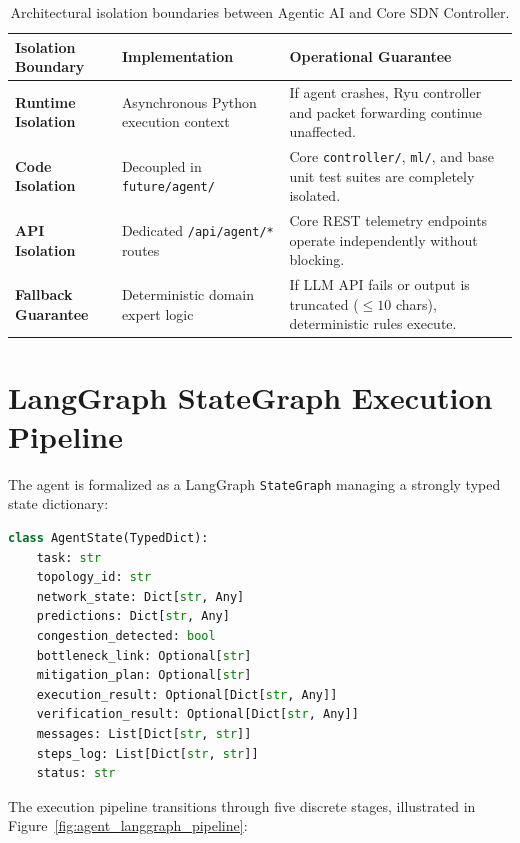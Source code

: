\begin{table}[H]
  \centering
  \small
  \caption{Architectural isolation boundaries between Agentic AI and Core SDN Controller.}
  \label{tab:agent_isolation}
  \begin{tabularx}{\textwidth}{l p{4.2cm} X}
    \toprule
    \textbf{Isolation Boundary} & \textbf{Implementation} & \textbf{Operational Guarantee} \\
    \midrule
    \textbf{Runtime Isolation} & Asynchronous Python execution context & If agent crashes, Ryu controller and packet forwarding continue unaffected. \\
    \textbf{Code Isolation} & Decoupled in \texttt{future/agent/} & Core \texttt{controller/}, \texttt{ml/}, and base unit test suites are completely isolated. \\
    \textbf{API Isolation} & Dedicated \texttt{/api/agent/*} routes & Core REST telemetry endpoints operate independently without blocking. \\
    \textbf{Fallback Guarantee} & Deterministic domain expert logic & If LLM API fails or output is truncated ($\le 10$ chars), deterministic rules execute. \\
    \bottomrule
  \end{tabularx}
\end{table}

\section{LangGraph StateGraph Execution Pipeline}
The agent is formalized as a LangGraph \texttt{StateGraph} managing a strongly typed state dictionary:

\begin{lstlisting}[language=Python,caption={LangGraph state schema for autonomous congestion control.}]
class AgentState(TypedDict):
    task: str
    topology_id: str
    network_state: Dict[str, Any]
    predictions: Dict[str, Any]
    congestion_detected: bool
    bottleneck_link: Optional[str]
    mitigation_plan: Optional[str]
    execution_result: Optional[Dict[str, Any]]
    verification_result: Optional[Dict[str, Any]]
    messages: List[Dict[str, str]]
    steps_log: List[Dict[str, str]]
    status: str
\end{lstlisting}

The execution pipeline transitions through five discrete stages, illustrated in Figure~\ref{fig:agent_langgraph_pipeline}:

